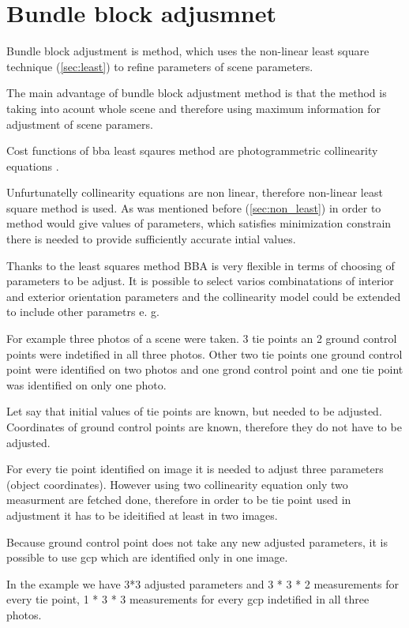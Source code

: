\documentclass[a4paper,12pt]{report}
\begin{document}
\section{Bundle block adjusmnet}

Bundle block adjustment is method, which uses the non-linear least square technique (\ref{sec:least}) to refine parameters 
of scene parameters. 

The main advantage of bundle block adjustment method is that the method is taking into acount whole scene and therefore using 
maximum information for adjustment of scene paramers.

Cost functions of bba least sqaures method are photogrammetric collinearity equations \label{eq:p_abbr}.

Unfurtunatelly collinearity equations are non linear, therefore non-linear least square method is used. 
As was mentioned before  (\ref{sec:non_least}) in order to method would give values of parameters, which 
satisfies minimization constrain there is needed to provide sufficiently accurate intial values.

Thanks to the least squares method BBA is very flexible in terms of choosing of parameters to be adjust. 
It is possible to select varios combinatations of interior and exterior orientation parameters and 
the collinearity model could be extended to include other parametrs e. g.  




For example three photos of a scene were taken. 3 tie points an 2 ground control points were indetified in all three photos.
Other two tie points one ground control point were identified on two photos and one grond control point and one tie point was identified 
on only one photo. 

Let say that initial values of tie points are known, but needed to be adjusted.
Coordinates of ground control points are known, therefore they do not have to be adjusted. 

For every tie point identified on image it is needed to adjust three parameters (object coordinates).
However using two collinearity equation only two measurment are fetched done, 
therefore in order to be tie point used in adjustment it has to be ideitified at least in two images. 

Because ground control point does not take any new adjusted parameters, it is possible to use gcp which are identified only in one image. 

In the example we have 3*3 adjusted parameters and 3 * 3 * 2 measurements for every tie point,  
1 * 3 * 3 measurements for every gcp indetified in all three photos. 
\end{document}
